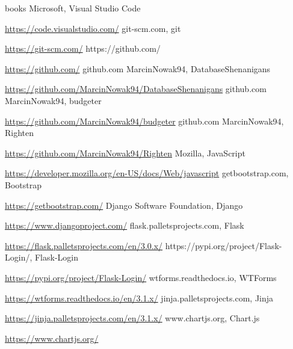 \documentclass[a4paper,10pt, twoside]{report}
\begin{document}
\begin{large}
\begin{thebibliography} {books}
     Microsoft, Visual Studio Code \raggedright\url{
        https://code.visualstudio.com/}
     git-scm.com, git \raggedright\url{
        https://git-scm.com/}
     https://github.com/ \raggedright\url{
        https://github.com/}
     github.com MarcinNowak94, DatabaseShenanigans \raggedright\url{
        https://github.com/MarcinNowak94/DatabaseShenanigans}
     github.com MarcinNowak94, budgeter \raggedright\url{
        https://github.com/MarcinNowak94/budgeter}
     github.com MarcinNowak94, Righten \raggedright\url{
        https://github.com/MarcinNowak94/Righten}
     Mozilla, JavaScript \raggedright\url{
        https://developer.mozilla.org/en-US/docs/Web/javascript}
     getbootstrap.com, Bootstrap \raggedright\url{
        https://getbootstrap.com/}
     Django Software Foundation, Django \raggedright\url{
        https://www.djangoproject.com/}
     flask.palletsprojects.com, Flask \raggedright\url{
        https://flask.palletsprojects.com/en/3.0.x/}
     https://pypi.org/project/Flask-Login/, Flask-Login \raggedright\url{
        https://pypi.org/project/Flask-Login/}
     wtforms.readthedocs.io, WTForms \raggedright\url{
        https://wtforms.readthedocs.io/en/3.1.x/}
     jinja.palletsprojects.com, Jinja \raggedright\url{
        https://jinja.palletsprojects.com/en/3.1.x/}
     www.chartjs.org, Chart.js \raggedright\url{
        https://www.chartjs.org/}
\end{thebibliography}

\listoffigures
\listoftables
\lstlistoflistings

\end{large}
\end{document}
